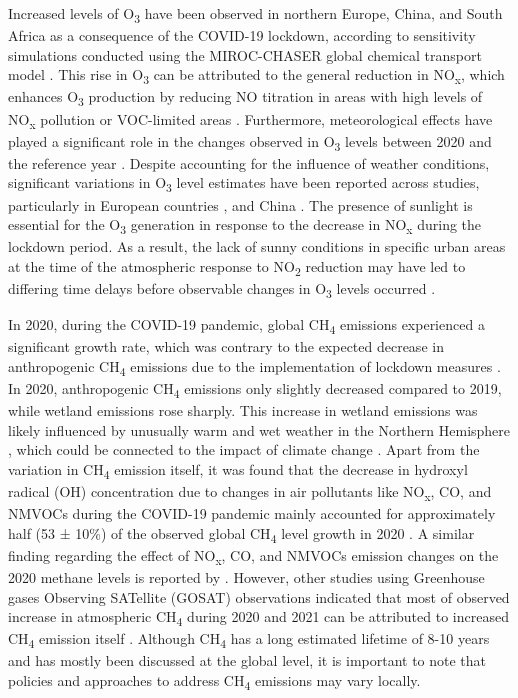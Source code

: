 Increased levels of O\textsubscript{3} have been observed in northern Europe, China, and South Africa as a consequence of the COVID-19 lockdown, according to sensitivity simulations conducted using the MIROC-CHASER global chemical transport model \citep{miyazaki2021global}. This rise in O\textsubscript{3} can be attributed to the general reduction in NO\textsubscript{x}, which enhances O\textsubscript{3} production by reducing NO titration in areas with high levels of NO\textsubscript{x} pollution or VOC-limited areas \citep{akimoto2022rethinking}. Furthermore, meteorological effects have played a significant role in the changes observed in O\textsubscript{3} levels between 2020 and the reference year \citep{ordonez2020early,liu2021diverse}. Despite accounting for the influence of weather conditions, significant variations in O\textsubscript{3} level estimates have been reported across studies, particularly in European countries \citep{ordonez2020early,grange2021covid}, and China \citep{liu2021diverse,shi2021abrupt}. The presence of sunlight is essential for the O\textsubscript{3} generation in response to the decrease in NO\textsubscript{x} during the lockdown period. As a result, the lack of sunny conditions in specific urban areas at the time of the atmospheric response to NO\textsubscript{2} reduction may have led to differing time delays before observable changes in O\textsubscript{3} levels occurred \citep{grange2021covid}. \par

In 2020, during the COVID-19 pandemic, global CH\textsubscript{4} emissions experienced a significant growth rate, which was contrary to the expected decrease in anthropogenic CH\textsubscript{4} emissions due to the implementation of lockdown measures \citep{peng2022wetland}.  In 2020, anthropogenic CH\textsubscript{4} emissions only slightly decreased compared to 2019, while wetland emissions rose sharply. This increase in wetland emissions was likely influenced by unusually warm and wet weather in the Northern Hemisphere \citep{peng2022wetland}, which could be connected to the impact of climate change \citep{zhang2023recent}. Apart from the variation in CH\textsubscript{4} emission itself, it was found that the decrease in hydroxyl radical (OH) concentration due to changes in air pollutants like NO\textsubscript{x}, CO, and NMVOCs during the COVID-19 pandemic mainly accounted for approximately half (53 ± 10\%) of the observed global CH\textsubscript{4} level growth in 2020 \citep{peng2022wetland}. A similar finding regarding the effect of NO\textsubscript{x}, CO, and NMVOCs emission changes on the 2020 methane levels is reported by \citep{stevenson2022covid}. However, other studies using Greenhouse gases Observing SATellite (GOSAT) observations indicated that most of observed increase in atmospheric CH\textsubscript{4} during 2020 and 2021 can be attributed to increased CH\textsubscript{4} emission itself \citep{qu2022attribution,feng2023methane}. Although CH\textsubscript{4} has a long estimated lifetime of 8-10 years and has mostly been discussed at the global level, it is important to note that policies and approaches to address CH\textsubscript{4} emissions may vary locally. \par

